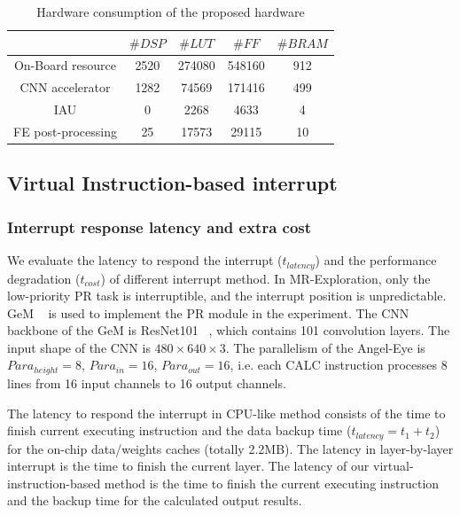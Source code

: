 \begin{table}[t]
  \centering
  \caption{Hardware consumption of the proposed hardware}
\begin{tabular}{|c|c|c|c|c|}
  \hline
        & $\# DSP$ & $\# LUT$ & $\# FF$ & $\# BRAM$ \\
  \hline
  On-Board resource &   2520   &  274080      &  548160     & 912 \\
  \hline
  CNN accelerator &   1282   &  74569      &   171416    & 499 \\
  \hline
  IAU &   0   &  2268      &   4633    & 4 \\
  \hline
  FE post-processing & 25      &  17573     &   29115    & 10 \\
  \hline
  \end{tabular}%
  
  \label{tab:hardware}%
\end{table}%


\subsection{Virtual Instruction-based interrupt }

\subsubsection{ Interrupt response latency and extra cost}


We evaluate the latency to respond the interrupt ($t_{latency}$) and the performance degradation ($t_{cost}$) of different interrupt method. In MR-Exploration, only the low-priority PR task is interruptible, and the interrupt position is unpredictable. GeM  ~\cite{radenovic2018fine} is used to implement the PR module in the experiment.
The CNN backbone of the GeM is ResNet101  ~\cite{he2016deep}, which contains 101 convolution layers. The input shape of the CNN is $480 \times 640 \times 3$. The parallelism of the Angel-Eye is $Para_{height}=8$, $Para_{in}=16$, $Para_{out}=16$, i.e. each CALC instruction processes 8 lines from 16 input channels to 16 output channels. 

The latency to respond the interrupt in CPU-like method consists of the time to finish current executing instruction and the data backup time ($t_{latency} = t_1+t_2$) for the on-chip data/weights caches (totally 2.2MB). The latency in layer-by-layer interrupt is the time to finish the current layer. The latency of our virtual-instruction-based method is the time to finish the current executing instruction and the backup time for the calculated output results. 

